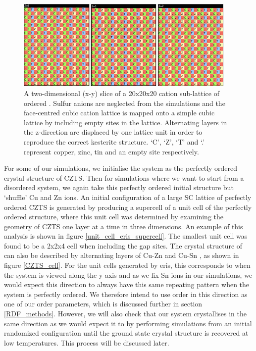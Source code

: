\begin{figure}[h!]
  \centering
    \includegraphics[width=0.95\textwidth]{figures/eris_config_eg.png}
    \caption{A two-dimensional (x-y) slice of a 20x20x20 cation sub-lattice of ordered { \CZTS }. Sulfur anions are neglected from the simulations and the face-centred cubic cation lattice is mapped onto a simple cubic lattice by including empty sites in the lattice. Alternating layers in the z-direction are displaced by one lattice unit in order to reproduce the correct kesterite structure. `C', `Z', `T' and `.' represent copper, zinc, tin and an empty site respectively.}
  \label{eris_config_eg}
\end{figure}

For some of our simulations, we initialise the system as the perfectly ordered crystal structure of CZTS. Then for simulations where we want to start from a disordered system, we again take this perfectly ordered initial structure but `shuffle' Cu and Zn ions. An initial configuration of a large SC lattice of perfectly ordered CZTS is generated by producing a supercell of a unit cell of the perfectly ordered structure, where this unit cell was determined by examining the geometry of CZTS one layer at a time in three dimensions. An example of this analysis is shown in figure \ref{unit_cell_eris_supercell}. The smallest unit cell was found to be a 2x2x4 cell when including the gap sites. The crystal structure of {\CZTS } can also be described by alternating layers of Cu-Zn and Cu-Sn \cite{Schorr}, as shown in figure \ref{CZTS_cell}. For the unit cells generated by eris, this corresponds to when the system is viewed along the y-axis and as we fix Sn ions in our simulations, we would expect this direction to always have this same repeating pattern when the system is perfectly ordered. We therefore intend to use order in this direction as one of our order parameters, which is discussed further in section \ref{RDF_methods}. However, we will also check that our system crystallises in the same direction as we would expect it to by performing simulations from an initial randomized configuration until the ground state crystal structure is recovered at low temperatures. This process will be discussed later.\\

